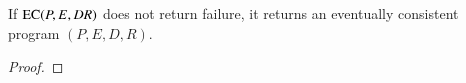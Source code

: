 \begin{theorem}
If $\textsc{EC}(P, E, D R)$ does not return failure, it returns an eventually consistent program $(P, E, D, R)$.
\end{theorem}
\begin{proof}
\end{proof}

